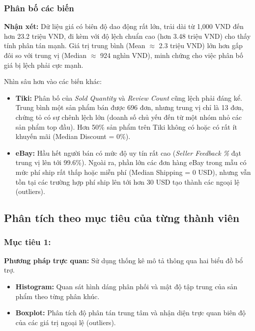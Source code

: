 \subsubsection{Phân bố các biến}




\textbf{Nhận xét:} 
Dữ liệu giá có biên độ dao động rất lớn, trải dài từ 1,000 VND đến hơn 23.2 triệu VND, đi kèm với độ lệch chuẩn cao (hơn 3.48 triệu VND) cho thấy tính phân tán mạnh. Giá trị trung bình (Mean $\approx$ 2.3 triệu VND) lớn hơn gấp đôi so với trung vị (Median $\approx$ 924 nghìn VND), minh chứng cho việc phân bố giá bị lệch phải cực mạnh. 

Nhìn sâu hơn vào các biến khác:
\begin{itemize}
    \item \textbf{Tiki:} Phân bố của \textit{Sold Quantity} và \textit{Review Count} cũng lệch phải đáng kể. Trung bình một sản phẩm bán được 696 đơn, nhưng trung vị chỉ là 13 đơn, chứng tỏ có sự chênh lệch lớn (doanh số chủ yếu đến từ một nhóm nhỏ các sản phẩm top đầu). Hơn 50\% sản phẩm trên Tiki không có hoặc có rất ít khuyến mãi (Median Discount = 0\%).
    \item \textbf{eBay:} Hầu hết người bán có mức độ uy tín rất cao (\textit{Seller Feedback \%} đạt trung vị lên tới 99.6\%). Ngoài ra, phần lớn các đơn hàng eBay trong mẫu có mức phí ship rất thấp hoặc miễn phí (Median Shipping = 0 USD), nhưng vẫn tồn tại các trường hợp phí ship lên tới hơn 30 USD tạo thành các ngoại lệ (outliers).
\end{itemize}

\subsection{Phân tích theo mục tiêu của từng thành viên}

\subsubsection{Mục tiêu 1:}



\noindent\textbf{Phương pháp trực quan:} 
    Sử dụng thống kê mô tả thông qua hai biểu đồ bổ trợ.
\begin{itemize}
    \item \textbf{Histogram:} Quan sát hình dáng phân phối và mật độ tập trung của sản phẩm theo từng phân khúc.
    \item \textbf{Boxplot:} Phân tích độ phân tán trung tâm và nhận diện trực quan biên độ của các giá trị ngoại lệ (outliers).
\end{itemize}

